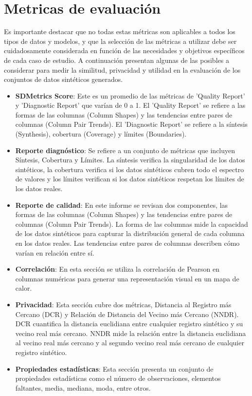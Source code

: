 \section{Metricas de evaluación}
Es importante destacar que no todas estas métricas son aplicables a todos los tipos de datos y modelos, y que la selección de las métricas a utilizar debe ser cuidadosamente considerada en función de las necesidades y objetivos específicos de cada caso de estudio.
A continuación presentan algunas de las posibles a considerar para medir la similitud, privacidad y utilidad en la evaluación de los conjuntos de datos sintéticos generados.
\begin{itemize}
\item \textbf{SDMetrics Score}: Este es un promedio de las métricas de 'Quality Report' y 'Diagnostic Report' que varían de 0 a 1. El 'Quality Report' se refiere a las formas de las columnas (Column Shapes) y las tendencias entre pares de columnas (Column Pair Trends). El 'Diagnostic Report' se refiere a la síntesis (Synthesis), cobertura (Coverage) y límites (Boundaries).
\item \textbf{Reporte diagnóstico}: Se refiere a un conjunto de métricas que incluyen Síntesis, Cobertura y Límites. La síntesis verifica la singularidad de los datos sintéticos, la cobertura verifica si los datos sintéticos cubren todo el espectro de valores y los límites verifican si los datos sintéticos respetan los límites de los datos reales.
\item \textbf{Reporte de calidad}: En este informe se revisan dos componentes, las formas de las columnas (Column Shapes) y las tendencias entre pares de columnas (Column Pair Trends). La forma de las columnas mide la capacidad de los datos sintéticos para capturar la distribución general de cada columna en los datos reales. Las tendencias entre pares de columnas describen cómo varían en relación entre sí.
\item \textbf{Correlación}: En esta sección se utiliza la correlación de Pearson en columnas numéricas para generar una representación visual en un mapa de calor.
\item \textbf{Privacidad}: Esta sección cubre dos métricas, Distancia al Registro más Cercano (DCR) y Relación de Distancia del Vecino más Cercano (NNDR). DCR cuantifica la distancia euclidiana entre cualquier registro sintético y su vecino real más cercano. NNDR mide la relación entre la distancia euclidiana al vecino real más cercano y al segundo vecino real más cercano de cualquier registro sintético.
\item \textbf{Propiedades estadísticas}: Esta sección presenta un conjunto de propiedades estadísticas como el número de observaciones, elementos faltantes, media, mediana, moda, entre otros.
\end{itemize}



